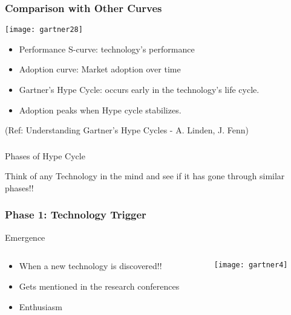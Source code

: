 \begin{frame}[fragile]\frametitle{Comparison with Other Curves}

\begin{center}
\texttt{[image: gartner28]}
\end{center}

\begin{itemize}
\item  Performance S-curve: technology's performance
\item  Adoption curve: Market adoption over time 
\item Gartner's Hype Cycle: occurs early in the technology's life cycle. 
\item Adoption peaks when Hype cycle stabilizes.
\end{itemize}

{\tiny (Ref: Understanding Gartner's Hype Cycles - A. Linden, J. Fenn)}
\end{frame}


\begin{frame}[fragile]\frametitle{}
\begin{center}
{\Large Phases of Hype Cycle}

Think of any Technology in the mind and see if it has gone through similar phases!!
\end{center}
\end{frame}


\begin{frame}[fragile]\frametitle{Phase 1: Technology Trigger}


Emergence

 \begin{columns}
  \begin{column}{0.55\linewidth}
\begin{itemize}
\item When a new technology is discovered!!
\item Gets mentioned in the research conferences
\item Enthusiasm
\end{itemize}
  \end{column}%
  \begin{column}{0.45\linewidth}
			\begin{center}
			\texttt{[image: gartner4]}
			\end{center}
  \end{column}
 \end{columns}
 
\end{frame}

